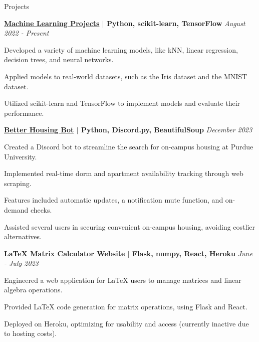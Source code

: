 \documentclass[
    11pt, %
]{resume} %
\begin{document}
\begin{rSection}{Projects}
\vspace*{-0.4cm}

    \begin{rSubsection}{}{}{\bf \href{}{Machine Learning Projects} $\mid$ Python, scikit-learn, TensorFlow }{\hfill \em August 2022 - Present}
        \item Developed a variety of machine learning models, like kNN, linear regression, decision trees, and neural networks.
        \item Applied models to real-world datasets, such as the Iris dataset and the MNIST dataset.
        \item Utilized scikit-learn and TensorFlow to implement models and evaluate their performance.
    \end{rSubsection}

\vspace*{-0.3cm}

    \begin{rSubsection}{}{}{\bf \href{https://github.com/maxinimus/better-housing-bot}{Better Housing Bot} $\mid$ Python, Discord.py, BeautifulSoup }{\hfill \em December 2023}
        \item Created a Discord bot to streamline the search for on-campus housing at Purdue University.
        \item Implemented real-time dorm and apartment availability tracking through web scraping.
        \item Features included automatic updates, a notification mute function, and on-demand checks.
        \item Assisted several users in securing convenient on-campus housing, avoiding costlier alternatives.
    \end{rSubsection}
\vspace*{-0.3cm}

    \begin{rSubsection}{}{}{\bf \href{https://github.com/maxinimus/LaTeX-Matrix-Calculator}{LaTeX Matrix Calculator Website} $\mid$ Flask, numpy, React, Heroku }{ \hfill \em June - July 2023}
        \item Engineered a web application for LaTeX users to manage matrices and linear algebra operations.
        \item Provided LaTeX code generation for matrix operations, using Flask and React.
        \item Deployed on Heroku, optimizing for usability and access (currently inactive due to hosting costs).
    \end{rSubsection}

\end{rSection}
\end{document}
